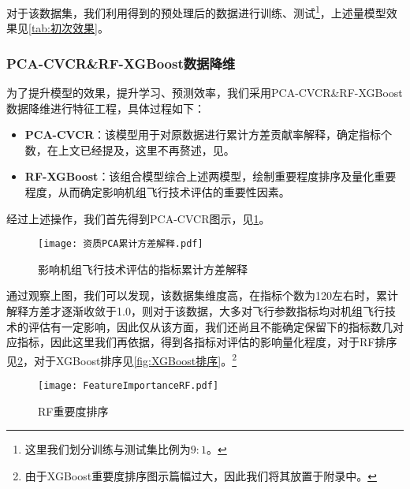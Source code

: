 \documentclass{MathorCupModeling}
\begin{document}
	对于该数据集，我们利用得到的预处理后的数据进行训练、测试\textcolor{blue}{\footnote{这里我们划分训练与测试集比例为$9:1$。}}，上述量模型效果见\textcolor{blue}{\cref{tab:初次效果}}。
\begin{table}[H]
	\centering
	\caption{RF与XGBoost初次学习效果}
	\label{tab:初次效果}
\end{table}
	\subsubsection{PCA-CVCR\&RF-XGBoost数据降维}
	为了提升模型的效果，提升学习、预测效率，我们采用PCA-CVCR\&RF-XGBoost数据降维进行特征工程，具体过程如下：
	\begin{itemize}
		\item \textbf{PCA-CVCR}：该模型用于对原数据进行累计方差贡献率解释，确定指标个数，在上文已经提及，这里不再赘述，见\textcolor{blue}{}。
		\item \textbf{RF-XGBoost}：该组合模型综合上述两模型，绘制重要程度排序及量化重要程度，从而确定影响机组飞行技术评估的重要性因素。
	\end{itemize}
	经过上述操作，我们首先得到PCA-CVCR图示，见\textcolor{blue}{\cref{fig:附件3累计方差解释}}。
	\begin{figure}[H]
		\centering
		\texttt{[image: 资质PCA累计方差解释.pdf]}
		\caption{影响机组飞行技术评估的指标累计方差解释}
		\label{fig:附件3累计方差解释}
	\end{figure}

	通过观察上图，我们可以发现，该数据集维度高，在指标个数为120左右时，累计解释方差才逐渐收敛于1.0，则对于该数据，大多对飞行参数指标均对机组飞行技术的评估有一定影响，因此仅从该方面，我们还尚且不能确定保留下的指标数几对应指标，因此这里我们再依据\textcolor{blue}{}，得到各指标对评估的影响量化程度，对于RF排序见\textcolor{blue}{\cref{fig:RF排序}}，对于XGBoost排序见\textcolor{blue}{\cref{fig:XGBoost排序}}。\textcolor{blue}{\footnote{由于XGBoost重要度排序图示篇幅过大，因此我们将其放置于附录中。}}
	\begin{figure}[H]
		\centering
		\texttt{[image: FeatureImportanceRF.pdf]}
		\caption{RF重要度排序}
		\label{fig:RF排序}
	\end{figure}
\end{document}
